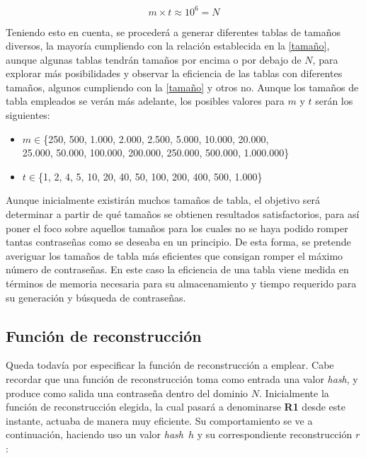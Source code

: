 \documentclass[12pt,spanish,listoffigures,listoftables,listofalgorithms]{tfgetsinf}
\newcommand{\hash}{\textit{hash}}
\begin{document}
\begin{center}
    \begin{equation}
        \tag{Fórmula 1}
        m \times t \approx 10^6 = N
        \label{tamaño}
    \end{equation}
\end{center}

Teniendo esto en cuenta, se procederá a generar diferentes tablas de tamaños diversos, la mayoría cumpliendo con la relación establecida en la \ref{tamaño}, aunque algunas tablas tendrán tamaños por encima o por debajo de $N$, para explorar más posibilidades y observar la eficiencia de las tablas con diferentes tamaños, algunos cumpliendo con la \ref{tamaño} y otros no. Aunque los tamaños de tabla empleados se verán más adelante, los posibles valores para $m$ y $t$ serán los siguientes:

\begin{itemize}

    \item $m \in $\{250, 500, 1.000, 2.000, 2.500, 5.000, 10.000, 20.000, \\
    25.000, 50.000, 100.000, 200.000, 250.000, 500.000, 1.000.000\}
    
    \item $t \in $\{1, 2, 4, 5, 10, 20, 40, 50, 100, 200, 400, 500, 1.000\}
    
\end{itemize}

Aunque inicialmente existirán muchos tamaños de tabla, el objetivo será determinar a partir de qué tamaños se obtienen resultados satisfactorios, para así poner el foco sobre aquellos tamaños para los cuales no se haya podido romper tantas contraseñas como se deseaba en un principio. De esta forma, se pretende averiguar los tamaños de tabla más eficientes que consigan romper el máximo número de contraseñas. En este caso la eficiencia de una tabla viene medida en términos de memoria necesaria para su almacenamiento y tiempo requerido para su generación y búsqueda de contraseñas.

\subsection{Función de reconstrucción}

Queda todavía por especificar la función de reconstrucción a emplear. Cabe recordar que una función de reconstrucción toma como entrada una valor \hash, y produce como salida una contraseña dentro del dominio $N$. Inicialmente la función de reconstrucción elegida, la cual pasará a denominarse \textbf{R1} desde este instante, actuaba de manera muy eficiente. Su comportamiento se ve a continuación, haciendo uso un valor \hash~$h$ y su correspondiente reconstrucción $r$:
\end{document}
